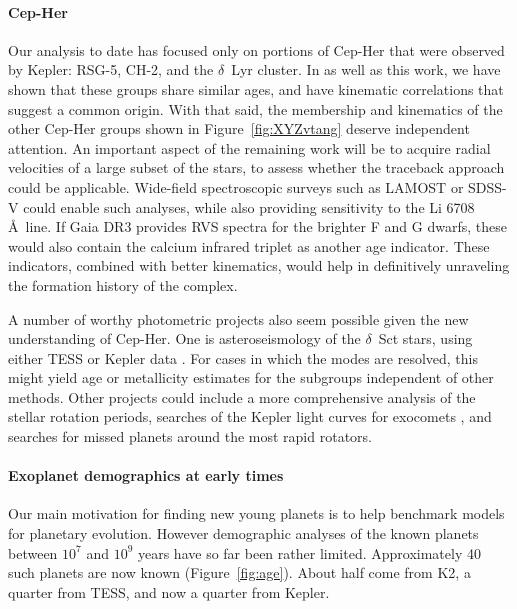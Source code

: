 \documentclass[12pt,twocolumn]{aastex63}
\begin{document}
\paragraph{Cep-Her}
Our analysis to date has focused only on portions of Cep-Her that were
observed by Kepler: RSG-5, CH-2, and the $\delta$~Lyr cluster.  In
\citet{bouma_kep1627_2022} as well as this work, we have shown that
these groups share similar ages, and have kinematic correlations that
suggest a common origin.  With that said, the membership and
kinematics of the other Cep-Her groups shown in
Figure~\ref{fig:XYZvtang} deserve independent attention.  An important
aspect of the remaining work will be to acquire radial velocities of a
large subset of the stars, to assess whether the traceback approach
could be applicable.  Wide-field spectroscopic surveys such as LAMOST
\citep{zhao_2012_LAMOST} or SDSS-V \citep{kollmeier_2017} could enable
such analyses, while also providing sensitivity to the Li 6708\,\AA\
line.  If Gaia DR3 provides RVS spectra for the brighter F and G
dwarfs, these would also contain the calcium infrared triplet as
another age indicator.  These indicators, combined with better
kinematics, would help in definitively unraveling the formation
history of the complex.

A number of worthy photometric projects also seem possible given the
new understanding of Cep-Her.  One is asteroseismology of the
$\delta$~Sct stars, using either TESS or Kepler data
\citep{bedding_very_2020}.  For cases in which the modes are resolved,
this might yield age or metallicity estimates for the subgroups
independent of other methods.  Other projects could include a more
comprehensive analysis of the stellar rotation periods,
searches of the Kepler light curves for exocomets
\citep{zieba_transiting_2019}, and searches for missed planets around
the most rapid rotators.

\paragraph{Exoplanet demographics at early times}
Our main motivation for finding new young planets is to help benchmark
models for planetary evolution.  However demographic analyses of the
known planets between $10^7$ and $10^9$ years have so far been rather
limited.  Approximately 40 such planets are now known
(Figure~\ref{fig:age}).  About half come from K2, a quarter from TESS,
and now a quarter from Kepler.
\end{document}
